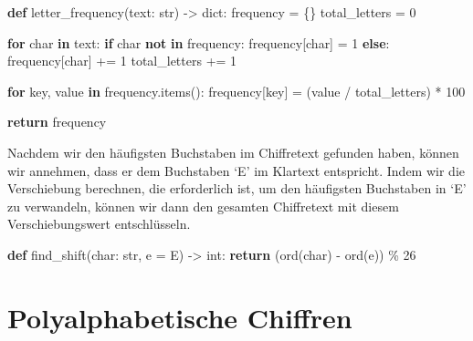 \documentclass[
  nswissgerman,
  a4paper,
  DIV=11,
  numbers=noendperiod,
  ngerman]{scrreprt}
\newenvironment{Shaded}{\begin{snugshade}}{\end{snugshade}}
\newcommand{\BuiltInTok}[1]{\textcolor[rgb]{0.00,0.23,0.31}{#1}}
\newcommand{\ControlFlowTok}[1]{\textcolor[rgb]{0.00,0.23,0.31}{\textbf{#1}}}
\newcommand{\DecValTok}[1]{\textcolor[rgb]{0.68,0.00,0.00}{#1}}
\newcommand{\KeywordTok}[1]{\textcolor[rgb]{0.00,0.23,0.31}{\textbf{#1}}}
\newcommand{\NormalTok}[1]{\textcolor[rgb]{0.00,0.23,0.31}{#1}}
\newcommand{\OperatorTok}[1]{\textcolor[rgb]{0.37,0.37,0.37}{#1}}
\newcommand{\StringTok}[1]{\textcolor[rgb]{0.13,0.47,0.30}{#1}}
\begin{document}
\begin{Shaded}
\begin{Highlighting}[numbers=left,,]
\KeywordTok{def}\NormalTok{ letter\_frequency(text: }\BuiltInTok{str}\NormalTok{) }\OperatorTok{{-}\textgreater{}} \BuiltInTok{dict}\NormalTok{:}
\NormalTok{    frequency }\OperatorTok{=}\NormalTok{ \{\}}
\NormalTok{    total\_letters }\OperatorTok{=} \DecValTok{0}
    
    \ControlFlowTok{for}\NormalTok{ char }\KeywordTok{in}\NormalTok{ text:}
        \ControlFlowTok{if}\NormalTok{ char }\KeywordTok{not} \KeywordTok{in}\NormalTok{ frequency:}
\NormalTok{            frequency[char] }\OperatorTok{=} \DecValTok{1}
        \ControlFlowTok{else}\NormalTok{:}
\NormalTok{            frequency[char] }\OperatorTok{+=} \DecValTok{1}
\NormalTok{        total\_letters }\OperatorTok{+=} \DecValTok{1}
        
    \ControlFlowTok{for}\NormalTok{ key, value }\KeywordTok{in}\NormalTok{ frequency.items():}
\NormalTok{        frequency[key] }\OperatorTok{=}\NormalTok{ (value }\OperatorTok{/}\NormalTok{ total\_letters) }\OperatorTok{*} \DecValTok{100}
        
           
    \ControlFlowTok{return}\NormalTok{ frequency}
\end{Highlighting}
\end{Shaded}

Nachdem wir den häufigsten Buchstaben im Chiffretext gefunden haben,
können wir annehmen, dass er dem Buchstaben `E' im Klartext entspricht.
Indem wir die Verschiebung berechnen, die erforderlich ist, um den
häufigsten Buchstaben in `E' zu verwandeln, können wir dann den gesamten
Chiffretext mit diesem Verschiebungswert entschlüsseln.

\begin{Shaded}
\begin{Highlighting}[numbers=left,,]
\KeywordTok{def}\NormalTok{ find\_shift(char: }\BuiltInTok{str}\NormalTok{, e }\OperatorTok{=} \StringTok{\textquotesingle{}E\textquotesingle{}}\NormalTok{) }\OperatorTok{{-}\textgreater{}} \BuiltInTok{int}\NormalTok{:}
    \ControlFlowTok{return}\NormalTok{ (}\BuiltInTok{ord}\NormalTok{(char) }\OperatorTok{{-}} \BuiltInTok{ord}\NormalTok{(e)) }\OperatorTok{\%} \DecValTok{26}
\end{Highlighting}
\end{Shaded}

\chapter{Polyalphabetische Chiffren}\label{polyalphabetische-chiffren}
\end{document}
